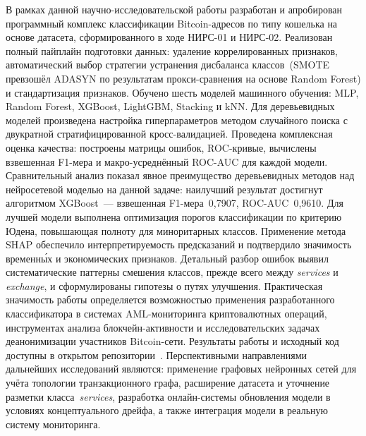 \conclusion
\begingroup{}\sloppy
В рамках данной научно-исследовательской работы разработан и апробирован программный комплекс классификации Bitcoin-адресов по типу кошелька на основе датасета, сформированного в ходе НИРС-01 и НИРС-02. Реализован полный пайплайн подготовки данных: удаление коррелированных признаков, автоматический выбор стратегии устранения дисбаланса классов~(SMOTE превзошёл ADASYN по результатам прокси-сравнения на основе Random Forest) и стандартизация признаков. Обучено шесть моделей машинного обучения: MLP, Random Forest, XGBoost, LightGBM, Stacking и kNN. Для деревьевидных моделей произведена настройка гиперпараметров методом случайного поиска с двукратной стратифицированной кросс-валидацией. Проведена комплексная оценка качества: построены матрицы ошибок, ROC-кривые, вычислены взвешенная F1-мера и макро-усреднённый ROC-AUC для каждой модели. Сравнительный анализ показал явное преимущество деревьевидных методов над нейросетевой моделью на данной задаче: наилучший результат достигнут алгоритмом XGBoost~--- взвешенная F1-мера~0,7907, ROC-AUC~0,9610. Для лучшей модели выполнена оптимизация порогов классификации по критерию Юдена, повышающая полноту для миноритарных классов. Применение метода SHAP обеспечило интерпретируемость предсказаний и подтвердило значимость временны́х и экономических признаков. Детальный разбор ошибок выявил систематические паттерны смешения классов, прежде всего между \textit{services} и \textit{exchange}, и сформулированы гипотезы о путях улучшения. Практическая значимость работы определяется возможностью применения разработанного классификатора в системах AML-мониторинга криптовалютных операций, инструментах анализа блокчейн-активности и исследовательских задачах деанонимизации участников Bitcoin-сети. Результаты работы и исходный код доступны в открытом репозитории~\cite{github_repo_nirs3}. Перспективными направлениями дальнейших исследований являются: применение графовых нейронных сетей для учёта топологии транзакционного графа, расширение датасета и уточнение разметки класса~\textit{services}, разработка онлайн-системы обновления модели в условиях концептуального дрейфа, а также интеграция модели в реальную систему мониторинга.
\par\endgroup
